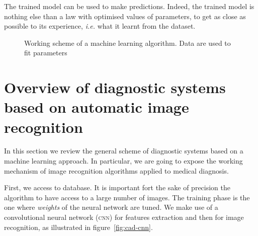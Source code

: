 \documentclass[a4paper, 10pt, superscriptaddress, nofootinbib, showkeys, notitlepage]{revtex4-1}
\begin{document}
	The trained model can be used to make predictions.
	Indeed, the trained model is nothing else than a law with optimised values of parameters, to get as close as possible to its experience, \emph{i.e.} what it learnt from the dataset.
		\begin{figure}[h]
		\centering
			\caption{Working scheme of a machine learning algorithm. Data are used to fit parameters }
			\label{fig:scheme}
		\end{figure}
\section{Overview of diagnostic systems based on automatic image recognition}
	In this section we review the general scheme of diagnostic systems based on a machine learning approach. 
	In particular, we are going to expose the working mechanism of image recognition algorithms applied to medical diagnosis.
	
	First, we access to database. 
	It is important fort the sake of precision the algorithm to have access to a large number of images.
	The training phase is the one where \emph{weights} of the neural network are tuned.
	We make use of a convolutional neural network (\textsc{cnn}) for features extraction and then for image recognition, as illustrated in figure~\ref{fig:cad-cnn}.
	
\end{document}
